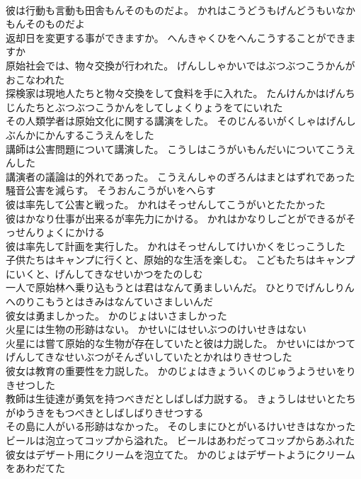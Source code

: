 \documentclass[8pt]{extreport}
\begin{document}
\begin{CJK}{UTF8}{min}
\\	彼は行動も言動も田舎もんそのものだよ。	かれはこうどうもげんどうもいなかもんそのものだよ 
\\	返却日を変更する事ができますか。	へんきゃくひをへんこうすることができますか 
\\	原始社会では、物々交換が行われた。	げんししゃかいではぶつぶつこうかんがおこなわれた 
\\	探検家は現地人たちと物々交換をして食料を手に入れた。	たんけんかはげんちじんたちとぶつぶつこうかんをしてしょくりょうをてにいれた 
\\	その人類学者は原始文化に関する講演をした。	そのじんるいがくしゃはげんしぶんかにかんするこうえんをした 
\\	講師は公害問題について講演した。	こうしはこうがいもんだいについてこうえんした 
\\	講演者の議論は的外れであった。	こうえんしゃのぎろんはまとはずれであった 
\\	騒音公害を減らす。	そうおんこうがいをへらす 
\\	彼は率先して公害と戦った。	かれはそっせんしてこうがいとたたかった 
\\	彼はかなり仕事が出来るが率先力にかける。	かれはかなりしごとができるがそっせんりょくにかける 
\\	彼は率先して計画を実行した。	かれはそっせんしてけいかくをじっこうした 
\\	子供たちはキャンプに行くと、原始的な生活を楽しむ。	こどもたちはキャンプにいくと、げんしてきなせいかつをたのしむ 
\\	一人で原始林へ乗り込もうとは君はなんて勇ましいんだ。	ひとりでげんしりんへのりこもうとはきみはなんていさましいんだ 
\\	彼女は勇ましかった。	かのじょはいさましかった 
\\	火星には生物の形跡はない。	かせいにはせいぶつのけいせきはない 
\\	火星には嘗て原始的な生物が存在していたと彼は力説した。	かせいにはかつてげんしてきなせいぶつがそんざいしていたとかれはりきせつした 
\\	彼女は教育の重要性を力説した。	かのじょはきょういくのじゅうようせいをりきせつした 
\\	教師は生徒達が勇気を持つべきだとしばしば力説する。	きょうしはせいとたちがゆうきをもつべきとしばしばりきせつする 
\\	その島に人がいる形跡はなかった。	そのしまにひとがいるけいせきはなかった 
\\	ビールは泡立ってコップから溢れた。	ビールはあわだってコップからあふれた 
\\	彼女はデザート用にクリームを泡立てた。	かのじょはデザートようにクリームをあわだてた 

\end{CJK}
\end{document}
